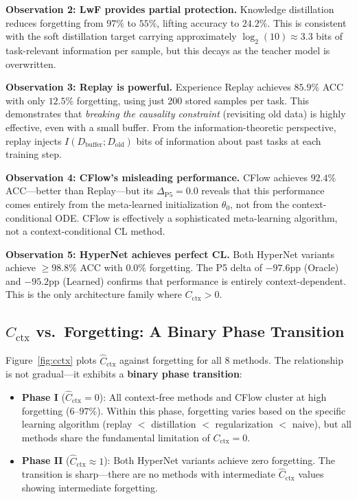 \documentclass{article}
\begin{document}
\textbf{Observation 2: LwF provides partial protection.} Knowledge distillation reduces forgetting from $97\%$ to $55\%$, lifting accuracy to $24.2\%$. This is consistent with the soft distillation target carrying approximately $\log_2(10) \approx 3.3$ bits of task-relevant information per sample, but this decays as the teacher model is overwritten.

\textbf{Observation 3: Replay is powerful.} Experience Replay achieves $85.9\%$ ACC with only $12.5\%$ forgetting, using just 200 stored samples per task. This demonstrates that \emph{breaking the causality constraint} (revisiting old data) is highly effective, even with a small buffer. From the information-theoretic perspective, replay injects $I(D_\mathrm{buffer}; D_\mathrm{old})$ bits of information about past tasks at each training step.

\textbf{Observation 4: CFlow's misleading performance.} CFlow achieves $92.4\%$ ACC---better than Replay---but its $\Delta_\mathrm{P5} = 0.0$ reveals that this performance comes entirely from the meta-learned initialization $\theta_0$, not from the context-conditional ODE. CFlow is effectively a sophisticated meta-learning algorithm, not a context-conditional CL method.

\textbf{Observation 5: HyperNet achieves perfect CL.} Both HyperNet variants achieve $\geq 98.8\%$ ACC with $0.0\%$ forgetting. The P5 delta of $-97.6$pp (Oracle) and $-95.2$pp (Learned) confirms that performance is entirely context-dependent. This is the only architecture family where $C_\mathrm{ctx} > 0$.

\subsection{$C_\mathrm{ctx}$ vs.\ Forgetting: A Binary Phase Transition}
\label{sec:phase_transition}

Figure~\ref{fig:cctx} plots $\hat{C}_\mathrm{ctx}$ against forgetting for all 8 methods. The relationship is not gradual---it exhibits a \textbf{binary phase transition}:

\begin{itemize}
    \item \textbf{Phase I} ($\hat{C}_\mathrm{ctx} = 0$): All context-free methods and CFlow cluster at high forgetting ($6$--$97\%$). Within this phase, forgetting varies based on the specific learning algorithm (replay $<$ distillation $<$ regularization $<$ naive), but all methods share the fundamental limitation of $C_\mathrm{ctx} = 0$.
    \item \textbf{Phase II} ($\hat{C}_\mathrm{ctx} \approx 1$): Both HyperNet variants achieve zero forgetting. The transition is sharp---there are no methods with intermediate $\hat{C}_\mathrm{ctx}$ values showing intermediate forgetting.
\end{itemize}
\end{document}
